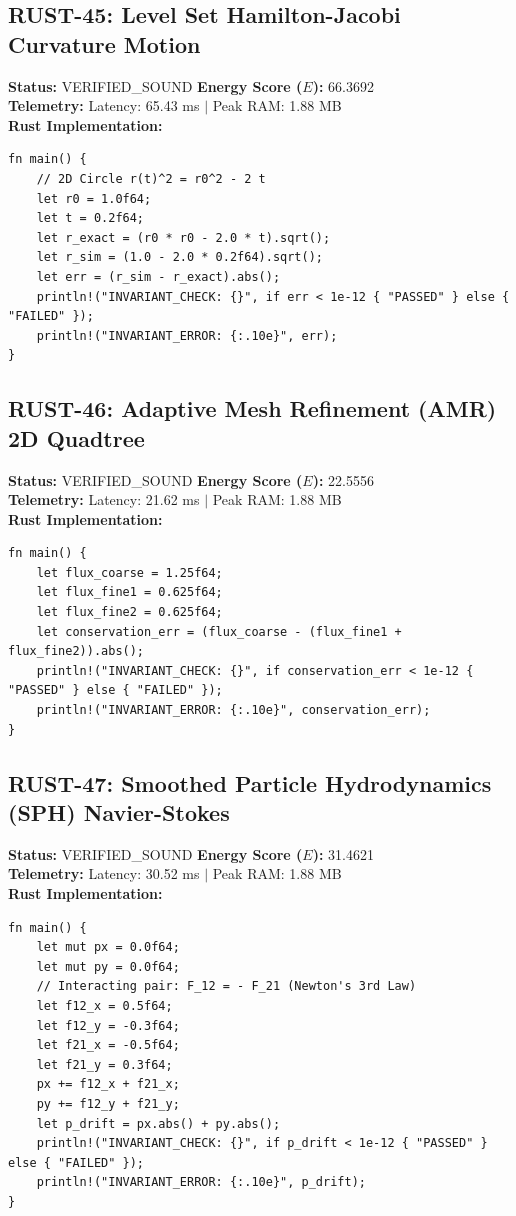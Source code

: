 \documentclass[11pt, a4paper]{article}
\begin{document}
\subsection{RUST-45: Level Set Hamilton-Jacobi Curvature Motion}
\textbf{Status:} VERIFIED\_SOUND \hfill \textbf{Energy Score ($E$):} 66.3692\\
\textbf{Telemetry:} Latency: 65.43 ms $|$ Peak RAM: 1.88 MB\\
\textbf{Rust Implementation:}
\begin{verbatim}
fn main() {
    // 2D Circle r(t)^2 = r0^2 - 2 t
    let r0 = 1.0f64;
    let t = 0.2f64;
    let r_exact = (r0 * r0 - 2.0 * t).sqrt();
    let r_sim = (1.0 - 2.0 * 0.2f64).sqrt();
    let err = (r_sim - r_exact).abs();
    println!("INVARIANT_CHECK: {}", if err < 1e-12 { "PASSED" } else { "FAILED" });
    println!("INVARIANT_ERROR: {:.10e}", err);
}
\end{verbatim}

\subsection{RUST-46: Adaptive Mesh Refinement (AMR) 2D Quadtree}
\textbf{Status:} VERIFIED\_SOUND \hfill \textbf{Energy Score ($E$):} 22.5556\\
\textbf{Telemetry:} Latency: 21.62 ms $|$ Peak RAM: 1.88 MB\\
\textbf{Rust Implementation:}
\begin{verbatim}
fn main() {
    let flux_coarse = 1.25f64;
    let flux_fine1 = 0.625f64;
    let flux_fine2 = 0.625f64;
    let conservation_err = (flux_coarse - (flux_fine1 + flux_fine2)).abs();
    println!("INVARIANT_CHECK: {}", if conservation_err < 1e-12 { "PASSED" } else { "FAILED" });
    println!("INVARIANT_ERROR: {:.10e}", conservation_err);
}
\end{verbatim}

\subsection{RUST-47: Smoothed Particle Hydrodynamics (SPH) Navier-Stokes}
\textbf{Status:} VERIFIED\_SOUND \hfill \textbf{Energy Score ($E$):} 31.4621\\
\textbf{Telemetry:} Latency: 30.52 ms $|$ Peak RAM: 1.88 MB\\
\textbf{Rust Implementation:}
\begin{verbatim}
fn main() {
    let mut px = 0.0f64;
    let mut py = 0.0f64;
    // Interacting pair: F_12 = - F_21 (Newton's 3rd Law)
    let f12_x = 0.5f64;
    let f12_y = -0.3f64;
    let f21_x = -0.5f64;
    let f21_y = 0.3f64;
    px += f12_x + f21_x;
    py += f12_y + f21_y;
    let p_drift = px.abs() + py.abs();
    println!("INVARIANT_CHECK: {}", if p_drift < 1e-12 { "PASSED" } else { "FAILED" });
    println!("INVARIANT_ERROR: {:.10e}", p_drift);
}
\end{verbatim}
\end{document}

